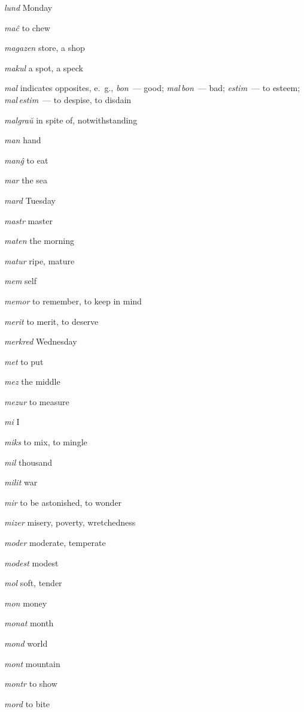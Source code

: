 \begin{landscape}
\begin{multicols}{5}
\begin{outdent}{1em}
\emph{lund}  Monday
\end{outdent}


\begin{outdent}{1em}
\emph{maĉ  }to chew

\emph{magazen } store, a shop

\emph{makul}  a spot, a speck

\emph{mal}  indicates opposites, e.~g., \emph{bon\,} — good; \emph{mal\,bon\,} — bad; \emph{estim\,} — to esteem; \emph{mal\,estim\,} — to despise, to disdain

\emph{malgraŭ}  in spite of, notwithstanding

\emph{man}  hand

\emph{manĝ}  to eat

\emph{mar } the sea

\emph{mard}  Tuesday

\emph{mastr}  master

\emph{maten}  the morning

\emph{matur}  ripe, mature

\emph{mem}  self

\emph{memor}  to remember, to keep in mind

\emph{merit}  to merit, to deserve

\emph{merkred}  Wednesday

\emph{met}  to put

\emph{mez } the middle

\emph{mezur } to measure

\emph{mi}  I

\emph{miks } to mix, to mingle

\emph{mil } thousand

\emph{milit}  war

\emph{mir}  to be astonished, to wonder

\emph{mizer } misery, poverty, wretchedness

\emph{moder}  moderate, temperate

\emph{modest}  modest

\emph{mol}  soft, tender

\emph{mon}  money

\emph{monat } month

\emph{mond}  world

\emph{mont  }mountain

\emph{montr } to show

\emph{mord } to bite


\end{outdent}
\end{multicols}
\end{landscape}
